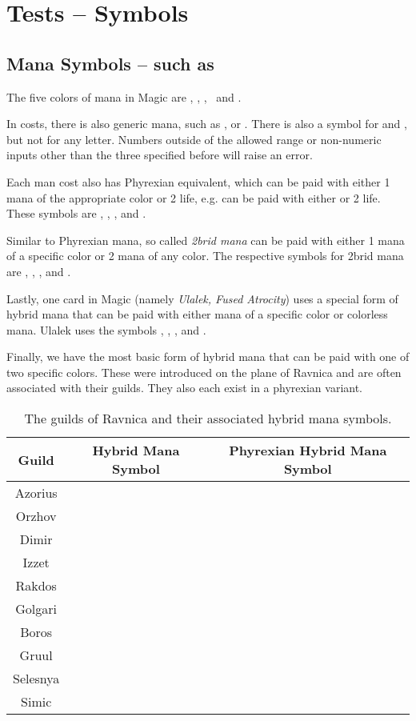 \documentclass[a4paper]{scrartcl}
\begin{document}
	\section*{Tests -- Symbols}

	\subsection*{Mana Symbols -- such as \mtgUR}
	The five colors of mana in Magic are \mtgwhite, \mtgblue, \mtgblack, \mtgred\ and \mtggreen .

	In costs, there is also generic mana, such as ,  or .
	There is also a symbol for  and , but not for any letter.
	Numbers outside of the allowed range or non-numeric inputs other than the three specified before will raise an error.

	Each man cost also has Phyrexian equivalent, which can be paid with either 1 mana of the appropriate color or 2 life, e.g. \mtgUP{} can be paid with either \mtgU{} or 2 life.
	These symbols are \mtgWP, \mtgUP, \mtgBP, \mtgRP{} and \mtgGP.

	Similar to Phyrexian mana, so called \emph{2brid mana} can be paid with either 1 mana of a specific color or 2 mana of any color.
	The respective symbols for 2brid mana are \mtgTwoW, \mtgTwoU, \mtgTwoB, \mtgTwoR{} and \mtgTwoG.

	Lastly, one card in Magic (namely \emph{Ulalek, Fused Atrocity}) uses a special form of hybrid mana that can be paid with either mana of a specific color or colorless mana.
	Ulalek uses the symbols \mtgCW, \mtgCU, \mtgCB, \mtgCR{} and \mtgCG.

	Finally, we have the most basic form of hybrid mana that can be paid with one of two specific colors.
	These were introduced on the plane of Ravnica and are often associated with their guilds.
	They also each exist in a phyrexian variant.
	\begin{table}[h]
		\begin{tabular}{c c c}
			\toprule
			\textbf{Guild} & \textbf{Hybrid Mana Symbol} & \textbf{Phyrexian Hybrid Mana Symbol}\\
			\midrule
			Azorius  & \mtgWU & \mtgWUP \\
			Orzhov   & \mtgWB & \mtgWBP \\
			Dimir    & \mtgUB & \mtgUBP \\
			Izzet    & \mtgUR & \mtgURP \\
			Rakdos   & \mtgBR & \mtgBRP \\
			Golgari  & \mtgBG & \mtgBGP \\
			Boros    & \mtgRW & \mtgRWP \\
			Gruul    & \mtgRG & \mtgRGP \\
			Selesnya & \mtgGW & \mtgGWP \\
			Simic    & \mtgGU & \mtgGUP \\
			\bottomrule
		\end{tabular}
		\caption{The guilds of Ravnica and their associated hybrid mana symbols.}
	\end{table}
\end{document}
